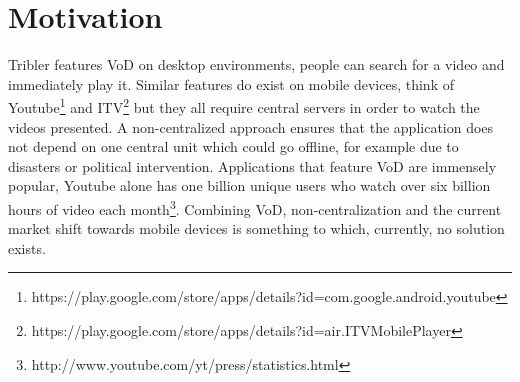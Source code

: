 \section{Motivation}
\label{sec:motivation}
Tribler features VoD on desktop environments, people can search for a video and immediately play it. Similar features do exist on mobile devices, think of Youtube\footnote{https://play.google.com/store/apps/details?id=com.google.android.youtube} and ITV\footnote{https://play.google.com/store/apps/details?id=air.ITVMobilePlayer} but they all require central servers in order to watch the videos presented. A non-centralized approach ensures that the application does not depend on one central unit which could go offline, for example due to disasters or political intervention. Applications that feature VoD are immensely popular, Youtube alone has one billion unique users who watch over six billion hours of video each month\footnote{http://www.youtube.com/yt/press/statistics.html}. Combining VoD, non-centralization and the current market shift towards mobile devices is something to which, currently, no solution exists.
